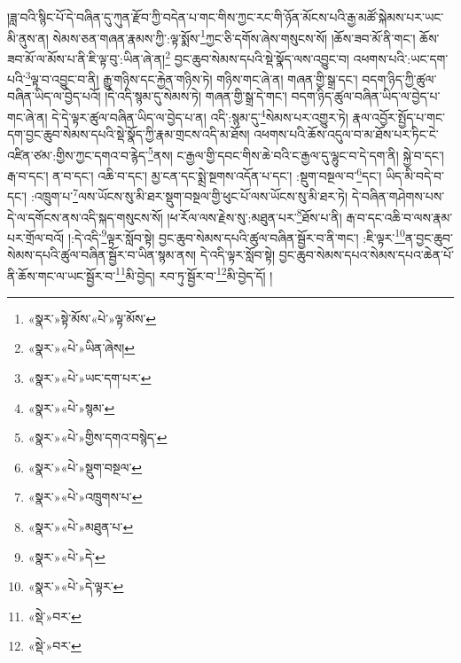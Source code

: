 །ཟླ་བའི་སྙིང་པོ་དེ་བཞིན་དུ་ཀུན་རྫོབ་ཀྱི་བདེན་པ་གང་གིས་ཀྱང་རང་གི་ཉོན་མོངས་པའི་རྒྱ་མཚོ་སྐེམས་པར་ཡང་མི་ནུས་ན། སེམས་ཅན་གཞན་རྣམས་ཀྱི་:ལྟ་སྨོས་\footnote{«སྣར་»སྟེ་མོས་«པེ་»ལྟ་མོས་}ཀྱང་ཅི་དགོས་ཞེས་གསུངས་སོ། །ཆོས་ཟབ་མོ་ནི་གང་། ཆོས་ཟབ་མོ་ལ་མོས་པ་ནི་ཇི་ལྟ་བུ་:ཡིན་ཞེ་ན།\footnote{«སྣར་»«པེ་»ཡིན་ཞེས།} བྱང་ཆུབ་སེམས་དཔའི་སྡེ་སྣོད་ལས་འབྱུང་བ། འཕགས་པའི་:ཡང་དག་པའི་\footnote{«སྣར་»«པེ་»ཡང་དག་པར་}ལྟ་བ་འབྱུང་བ་ནི། རྒྱུ་གཉིས་དང་རྐྱེན་གཉིས་ཏེ། གཉིས་གང་ཞེ་ན། གཞན་གྱི་སྒྲ་དང་། བདག་ཉིད་ཀྱི་ཚུལ་བཞིན་ཡིད་ལ་བྱེད་པའོ། །དེ་འདི་སྙམ་དུ་སེམས་ཏེ། གཞན་གྱི་སྒྲ་དེ་གང་། བདག་ཉིད་ཚུལ་བཞིན་ཡིད་ལ་བྱེད་པ་གང་ཞེ་ན། དེ་དེ་ལྟར་ཚུལ་བཞིན་ཡིད་ལ་བྱེད་པ་ན། འདི་:སྙམ་དུ་\footnote{«སྣར་»«པེ་»སྙམ་}སེམས་པར་འགྱུར་ཏེ། རྣལ་འབྱོར་སྤྱོད་པ་གང་དག་བྱང་ཆུབ་སེམས་དཔའི་སྡེ་སྣོད་ཀྱི་རྣམ་གྲངས་འདི་མ་ཐོས། འཕགས་པའི་ཆོས་འདུལ་བ་མ་ཐོས་པར་ཏིང་ངེ་འཛིན་ཙམ་:གྱིས་ཀྱང་དགའ་བ་རྙེད་\footnote{«སྣར་»«པེ་»གྱིས་དགའ་བསྙེད་}ནས། ང་རྒྱལ་གྱི་དབང་གིས་ཆེ་བའི་ང་རྒྱལ་དུ་ལྷུང་བ་དེ་དག་ནི། སྐྱེ་བ་དང་། རྒ་བ་དང་། ན་བ་དང་། འཆི་བ་དང་། མྱ་ངན་དང་སྨྲེ་སྔགས་འདོན་པ་དང་། :སྡུག་བསྔལ་བ་\footnote{«སྣར་»«པེ་»སྡུག་བསྔལ་}དང་། ཡིད་མི་བདེ་བ་དང་། :འཁྲུག་པ་\footnote{«སྣར་»«པེ་»འཁྲུགས་པ་}ལས་ཡོངས་སུ་མི་ཐར་སྡུག་བསྔལ་གྱི་ཕུང་པོ་ལས་ཡོངས་སུ་མི་ཐར་ཏེ། དེ་བཞིན་གཤེགས་པས་དེ་ལ་དགོངས་ནས་འདི་སྐད་གསུངས་སོ། །ཕ་རོལ་ལས་རྗེས་སུ་:མཐུན་པར་\footnote{«སྣར་»«པེ་»མཐུན་པ་}ཐོས་པ་ནི། རྒ་བ་དང་འཆི་བ་ལས་རྣམ་པར་གྲོལ་བའོ། །:དེ་འདི་\footnote{«སྣར་»«པེ་»དེ་}ལྟར་སློབ་སྟེ། བྱང་ཆུབ་སེམས་དཔའི་ཚུལ་བཞིན་སྦྱོར་བ་ནི་གང་། :ཇི་ལྟར་\footnote{«སྣར་»«པེ་»དེ་ལྟར་}ན་བྱང་ཆུབ་སེམས་དཔའི་ཚུལ་བཞིན་སྦྱོར་བ་ཡིན་སྙམ་ནས། དེ་འདི་ལྟར་སློབ་སྟེ། བྱང་ཆུབ་སེམས་དཔའ་སེམས་དཔའ་ཆེན་པོ་ནི་ཆོས་གང་ལ་ཡང་སྦྱོར་བ་\footnote{«སྡེ་»བར་}མི་བྱེད། རབ་ཏུ་སྦྱོར་བ་\footnote{«སྡེ་»བར་}མི་བྱེད་དོ། །
